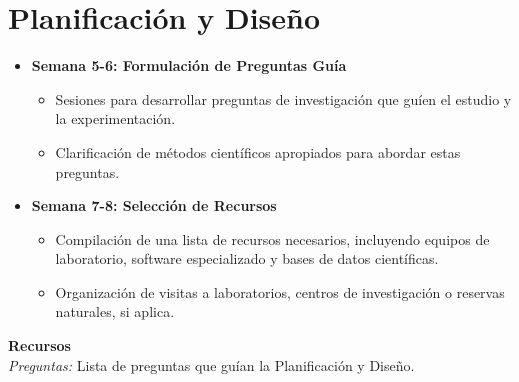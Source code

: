 \newpage
\section{Planificación y Diseño}
\begin{itemize}
  \item \textbf{Semana 5-6: Formulación de Preguntas Guía}
  \begin{itemize}
    \item Sesiones para desarrollar preguntas de investigación que guíen el estudio y la experimentación.
    \item Clarificación de métodos científicos apropiados para abordar estas preguntas.
  \end{itemize}
  \item \textbf{Semana 7-8: Selección de Recursos}
  \begin{itemize}
    \item Compilación de una lista de recursos necesarios, incluyendo equipos de laboratorio, software especializado y bases de datos científicas.
    \item Organización de visitas a laboratorios, centros de investigación o reservas naturales, si aplica.
  \end{itemize}
\end{itemize}

{\large \textbf{Recursos}}\\
\textit{Preguntas:} Lista de preguntas que guían la Planificación y Diseño.

